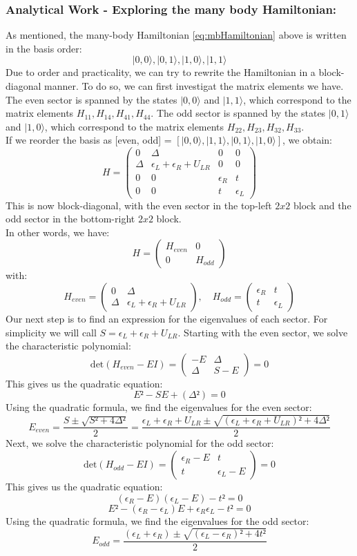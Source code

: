 \documentclass[11pt, letterpaper, titlepage]{article}
\begin{document}
\subsubsection{Analytical Work - Exploring the many body Hamiltonian:} 
As mentioned, the many-body Hamiltonian \ref{eq:mbHamiltonian} above is written in the basis order:
$$ |0,0⟩, |0,1⟩, |1,0⟩, |1,1⟩ $$
Due to order and practicality, we can try to rewrite the Hamiltonian in a block-diagonal manner. To do so, we can first investigat the matrix elements we have. The even sector is spanned by the states $|0,0⟩$ and $|1,1⟩$, which correspond to the matrix elements $H_{11}, H_{14}, H_{41}, H_{44}$. The odd sector is spanned by the states $|0,1⟩$ and $|1,0⟩$, which correspond to the matrix elements $H_{22}, H_{23}, H_{32}, H_{33}$.\\
If we reorder the basis as [even, odd] = $[|0,0⟩, |1,1⟩, |0,1⟩, |1,0⟩]$, we obtain:
$$
H = \begin{pmatrix}
0 & Δ & 0 & 0 \\
Δ & ϵ_L + ϵ_R + U_{LR} & 0 & 0 \\
0 & 0 & ϵ_R & t \\
0 & 0 & t & ϵ_L
\end{pmatrix}
$$
This is now block-diagonal, with the even sector in the top-left $2x2$ block and the odd sector in the bottom-right $2x2$ block.\\
In other words, we have:
$$
H = \begin{pmatrix}
H_{even} & 0 \\
0 & H_{odd}
\end{pmatrix}
$$
with:
$$
H_{even} = \begin{pmatrix}
0 & Δ \\
Δ & ϵ_L + ϵ_R + U_{LR}
\end{pmatrix}, \quad
H_{odd} = \begin{pmatrix}
ϵ_R & t \\
t & ϵ_L
\end{pmatrix}
$$
Our next step is to find an expression for the eigenvalues of each sector. For simplicity we will call $S = ϵ_L + ϵ_R + U_{LR}$. Starting with the even sector, we solve the characteristic polynomial:
$$
\text{det}(H_{even} - EI) = \begin{pmatrix}
    -E & Δ \\
    Δ & S - E
\end{pmatrix} =0
$$
This gives us the quadratic equation:
$$
E² - SE + (Δ²) = 0
$$
Using the quadratic formula, we find the eigenvalues for the even sector:
$$E_{even} = \frac{S ± \sqrt{S² + 4Δ²}}{2} = \frac{ϵ_L + ϵ_R + U_{LR} ± \sqrt{(ϵ_L + ϵ_R + U_{LR})² + 4Δ²}}{2}$$
Next, we solve the characteristic polynomial for the odd sector:
$$
\text{det}(H_{odd} - EI) = \begin{pmatrix}
    ϵ_R - E & t \\
    t & ϵ_L - E
\end{pmatrix} =0
$$
This gives us the quadratic equation:
$$(ϵ_R-E)(ϵ_L - E)  - t² = 0$$
$$E² -(ϵ_R-ϵ_L)E + ϵ_R ϵ_L - t² = 0$$
Using the quadratic formula, we find the eigenvalues for the odd sector:
$$E_{odd} = \frac{(ϵ_L + ϵ_R) ± \sqrt{(ϵ_L - ϵ_R)² + 4t²}}{2}$$
\end{document}
